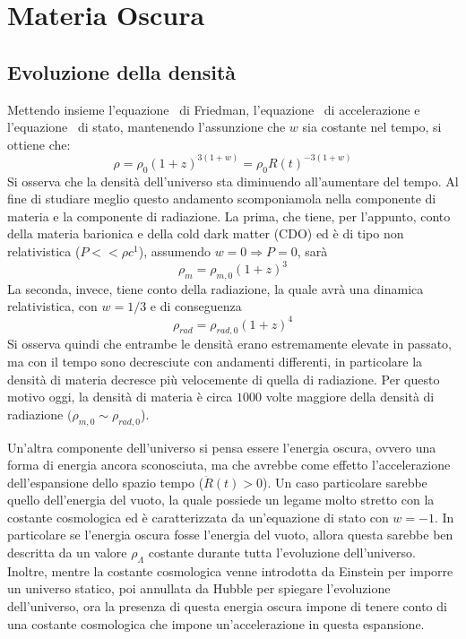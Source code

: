 \section{Materia Oscura}\label{sec:materia-oscura}
\subsection{Evoluzione della densità}\label{sec:evoluazione-densita}
Mettendo insieme l'equazione~ di Friedman, l'equazione~ di accelerazione e l'equazione~ di stato, mantenendo l'assunzione che $w$ sia costante nel tempo, si ottiene che:
\[
    \rho = \rho_0 {(1+z)}^{3(1+w)} = \rho_0 {R(t)}^{-3(1+w)}
\]
Si osserva che la densità dell'universo sta diminuendo all'aumentare del tempo. Al fine di studiare meglio questo andamento scomponiamola nella componente di materia e la componente di radiazione. La prima, che tiene, per l'appunto, conto della materia barionica e della cold dark matter (CDO) ed è di tipo non relativistica ($P<<\rho c^1$), assumendo $w = 0 \Rightarrow P=0$, sarà
\[
    \rho_m = \rho_{m,0}{(1+z)}^3
\]
La seconda, invece, tiene conto della radiazione, la quale avrà una dinamica relativistica, con $w = 1/3$ e di conseguenza
\[
    \rho_{rad} = \rho_{rad, 0}{(1+z)}^4
\]
Si osserva quindi che entrambe le densità erano estremamente elevate in passato, ma con il tempo sono decresciute con andamenti differenti, in particolare la densità di materia decresce più velocemente di quella di radiazione. Per questo motivo oggi, la densità di materia è circa $1000$ volte maggiore della densità di radiazione $(\rho_{m,0} \sim \rho_{rad, 0}$).

Un'altra componente dell'universo si pensa essere l'energia oscura, ovvero una forma di energia ancora sconosciuta, ma che avrebbe come effetto l'accelerazione dell'espansione dello spazio tempo ($\ddot{R}(t)>0$). Un caso particolare sarebbe quello dell'energia del vuoto, la quale possiede un legame molto stretto con la costante cosmologica ed è caratterizzata da un'equazione di stato con $w = -1$. In particolare se l'energia oscura fosse l'energia del vuoto, allora questa sarebbe ben descritta da un valore $\rho_{\Lambda}$ costante durante tutta l'evoluzione dell'universo. Inoltre, mentre la costante cosmologica venne introdotta da Einstein per imporre un universo statico, poi annullata da Hubble per spiegare l'evoluzione dell'universo, ora la presenza di questa energia oscura impone di tenere conto di una costante cosmologica che impone un'accelerazione in questa espansione.

